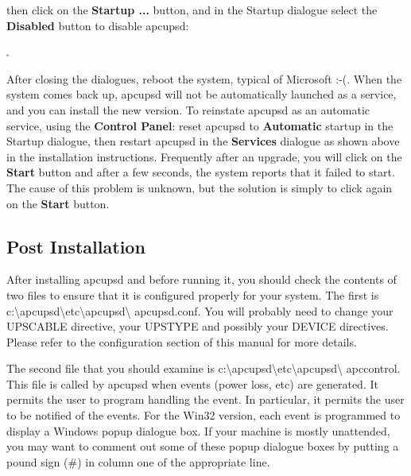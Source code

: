 {{{{{{{{{{then click on the {\bf Startup ...} button, and in the Startup dialogue select
the {\bf Disabled} button to disable apcupsd:  

\includegraphics{./wininstall7.eps}  

After closing the dialogues, reboot the system, typical of Microsoft :-(. When
the system comes back up, apcupsd will not be automatically launched as a
service, and you can install the new version. To reinstate apcupsd as an
automatic service, using the {\bf Control Panel}: reset apcupsd to {\bf
Automatic} startup in the Startup dialogue, then restart apcupsd in the {\bf
Services} dialogue as shown above in the installation instructions. Frequently
after an upgrade, you will click on the {\bf Start} button and after a few
seconds, the system reports that it failed to start. The cause of this problem
is unknown, but the solution is simply to click again on the {\bf Start}
button. 

\label{Post-Installation}

\subsection*{Post Installation}

\label{index-Windows_002c-Post-Installation-177}
After installing apcupsd and before running it, you should check the contents
of two files to ensure that it is configured properly for your system. The
first is
c:\textbackslash{}apcupsd\textbackslash{}etc\textbackslash{}apcupsd\textbackslash
{}apcupsd.conf. You will probably need to change your UPSCABLE directive, your
UPSTYPE and possibly your DEVICE directives. Please refer to the configuration
section of this manual for more details.  

The second file that you should examine is
c:\textbackslash{}apcupsd\textbackslash{}etc\textbackslash{}apcupsd\textbackslash
{}apccontrol. This file is called by apcupsd when events (power loss, etc) are
generated. It permits the user to program handling the event. In particular,
it permits the user to be notified of the events. For the Win32 version, each
event is programmed to display a Windows popup dialogue box. If your machine
is mostly unattended, you may want to comment out some of these popup dialogue
boxes by putting a pound sign (\#) in column one of the appropriate line. 

}}}}}}}}}}
